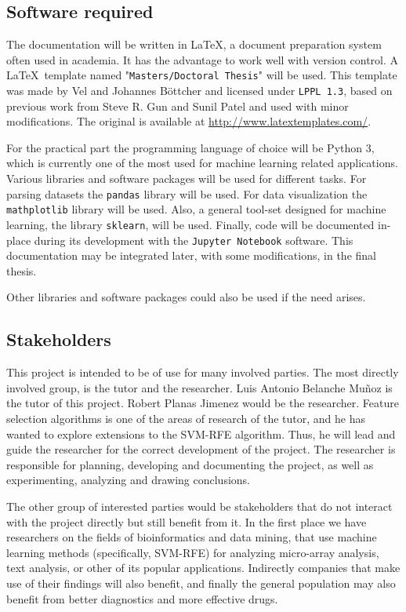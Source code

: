 \subsection{Software required}

The documentation will be written in \LaTeX, a document preparation system often used in academia. It has the advantage to work well with version control. A \LaTeX \ template named "\texttt{Masters/Doctoral Thesis}" will be used. This template was made by Vel and Johannes Böttcher and licensed under \texttt{LPPL 1.3}, based on previous work from Steve R. Gun and Sunil Patel and used with minor modifications. The original is available at \url{http://www.latextemplates.com/}.

For the practical part the programming language of choice will be Python 3, which is currently one of the most used for machine learning related applications. Various libraries and software packages will be used for different tasks. For parsing datasets the \texttt{pandas} library will be used. For data visualization the \texttt{mathplotlib} library will be used. Also, a general tool-set designed for machine learning, the library \texttt{sklearn}, will be used. Finally, code will be documented in-place during its development with the \texttt{Jupyter Notebook} software. This documentation may be integrated later, with some modifications, in the final thesis.


Other libraries and software packages could also be used if the need arises. 


\subsection{Stakeholders}

This project is intended to be of use for many involved parties. The most directly involved group, is the tutor and the researcher. Luis Antonio Belanche Muñoz is the tutor of this project. Robert Planas Jimenez would be the researcher. Feature selection algorithms is one of the areas of research of the tutor, and he has wanted to explore extensions to the SVM-RFE algorithm. Thus, he will lead and guide the researcher for the correct development of the project. The researcher is responsible for planning, developing and documenting the project, as well as experimenting, analyzing and drawing conclusions.

The other group of interested parties would be stakeholders that do not interact with the project directly but still benefit from it. In the first place we have researchers on the fields of bioinformatics and data mining, that use machine learning methods (specifically, SVM-RFE) for analyzing micro-array analysis, text analysis, or other of its popular applications. Indirectly companies that make use of their findings will also benefit, and finally the general population may also benefit from better diagnostics and more effective drugs. 

